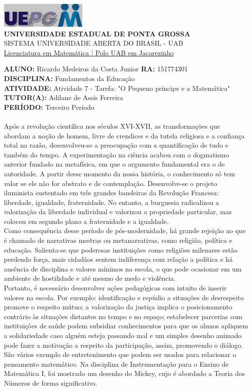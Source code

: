 \documentclass[a4paper, 12pt]{article}
\begin{document}
\begin{flushleft}\includegraphics{logo}\\
\textbf{UNIVERSIDADE ESTADUAL DE PONTA GROSSA} \\
SISTEMA UNIVERSIDADE ABERTA DO BRASIL - UAB \\
\underline{Licenciatura em Matemática | Polo UAB em Jacarezinho}\end{flushleft} 
\textbf{ALUNO:} Ricardo Medeiros da Costa Junior   \textbf{RA:} 151774301 \\
\textbf{DISCIPLINA:} Fundamentos da Educação\\
\textbf{ATIVIDADE:} Atividade 7 - Tarefa: "O Pequeno príncipe e a Matemática"\\
\textbf{TUTOR(A):} Adilane de Assis Ferreira\\
\textbf{PERÍODO:} Terceiro Período \\ \\

Após a revolução científica nos séculos XVI-XVII, as transformações que abordam a noção de homem, livre de crendices e da tutela religiosa e a confiança total na razão, desenvolveu-se a preocupação com a quantificação de tudo e também do tempo. A experimentação na ciência acabou com o dogmatismo anterior fundado na metafísica, em que o argumento fundamental era o de autoridade. A partir desse momento da nossa história, o conhecimento só tem valor se ele não for abstrato e de contemplação. Desenvolve-se o projeto iluminista sustentado em três grandes bandeiras da Revolução Francesa: liberdade, igualdade, fraternidade. No entanto, a burguesia radicalizou a valorização da liberdade individual e valorizou a propriedade particular, mas colocou em segundo plano a fraternidade e a igualdade.\\
Como consequência desse período de pós-modernidade, há grande rejeição ao que é chamado de narrativas mestras ou metanarrativas, como religião, política e educação. Salienta-se que poderosas instituições como religiões milenares estão perdendo força, mais cidadãos sentem indiferença com relação a política e há ausência de disciplina e valores mínimos na escola, o que pode ocasionar em um ambiente de hostilidade e até mesmo de medo e violência.\\
Portanto, é necessário desenvolver ações pedagógicas com intuito de inserir valores na escola. Por exemplo: identificação e repúdio a situações de desrespeito promove o respeito mútuo; a valorização da justiça implica o posicionamento contrário às situações distantes no tempo e no espaço; estabelecer parcerias com instituições de saúde podem subsidiar conhecimentos para que os alunos apliquem a solidariedade caso alguém esteja passando mal e um simples desenho animado pode fazer a motivação a respeito da participação, assim, promovendo o diálogo.\\
São vários exemplo de entretenimento que podem ser usados para relacionar o pensamento matemático. Na disciplina de Instrumentação para o Ensino de Matemática I, foi mostrado um desenho do Mickey, cujo é abordado a Teoria dos Números de forma significativa.
\end{document}
